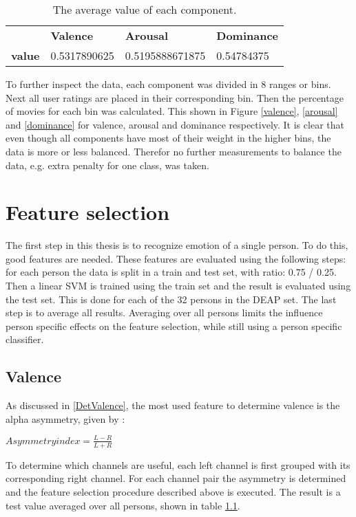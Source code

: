 \begin{table}[H]
\centering
\caption{The average value of each component.}
\label{avg-vals}
\begin{tabular}{llll}
\textbf{}  & \textbf{Valence} & \textbf{Arousal} & \textbf{Dominance} \\
\textbf{value} & 0.5317890625     & 0.5195888671875  & 0.54784375        
\end{tabular}
\end{table}

To further inspect the data, each component was divided in 8 ranges or bins. Next all user ratings are placed in their corresponding bin. Then the percentage of movies for each bin was calculated. This shown in Figure \ref{valence}, \ref{arousal} and \ref{dominance} for valence, arousal and dominance respectively. It is clear that even though all components have most of their weight in the higher bins, the data is more or less balanced. Therefor no further measurements to balance the data, e.g. extra penalty for one class, was taken.


\section{Feature selection}

The first step in this thesis is to recognize emotion of a single person. To do this, good features are needed. These features are evaluated using the following steps: for each person the data is split in a train and test set, with ratio: 0.75 / 0.25. Then a linear SVM is trained using the train set and the result is evaluated using the test set. This is done for each of the 32 persons in the DEAP set. The last step is to average all results. Averaging over all persons limits the influence person specific effects on the feature selection, while still using a person specific classifier.

\subsection{Valence}
As discussed in \ref{DetValence}, the most used feature to determine valence is the alpha asymmetry, given by :
\begin{center}
$Asymmetry index = \frac{L-R}{L+R}$
\end{center}
To determine which channels are useful, each left channel is first grouped with its corresponding right channel. For each channel pair the asymmetry is determined and the feature selection procedure described above is executed. The result is a test value averaged over all persons, shown in table \ref{}.
